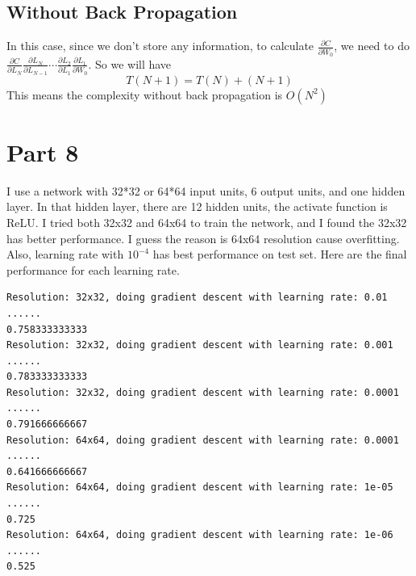 \documentclass[12pt]{article}
\begin{document}
\subsection*{Without Back Propagation}
In this case, since we don't store any information, to calculate $\frac{\partial C}{\partial W_0}$, we need to do $\frac{\partial C}{\partial L_N}\frac{\partial L_N}{\partial L_{N-1}}\cdots \frac{\partial L_2}{\partial L_1}\frac{\partial L_1}{\partial W_0}$. So we will have
\[
    T(N+1) = T(N) + (N + 1)
\]
This means the complexity without back propagation is $O(N^2)$

\section*{Part 8}
I use a network with 32*32 or 64*64 input units, 6 output units, and one hidden layer. In that hidden layer, there are 12 hidden units, the activate function is ReLU. I tried both 32x32 and 64x64 to train the network, and I found the 32x32 has better performance. I guess the reason is 64x64 resolution cause overfitting. Also, learning rate with $10^{-4}$ has best performance on test set. Here are the final performance for each learning rate.
\begin{lstlisting}
Resolution: 32x32, doing gradient descent with learning rate: 0.01 ......
0.758333333333
Resolution: 32x32, doing gradient descent with learning rate: 0.001 ......
0.783333333333
Resolution: 32x32, doing gradient descent with learning rate: 0.0001 ......
0.791666666667
Resolution: 64x64, doing gradient descent with learning rate: 0.0001 ......
0.641666666667
Resolution: 64x64, doing gradient descent with learning rate: 1e-05 ......
0.725
Resolution: 64x64, doing gradient descent with learning rate: 1e-06 ......
0.525
\end{lstlisting}
\end{document}

